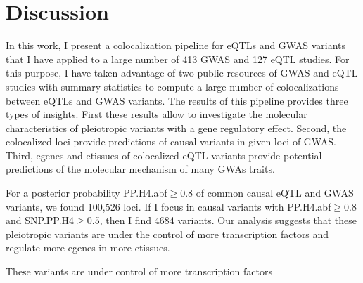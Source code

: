 \section*{Discussion}

In this work, I present a colocalization pipeline for eQTLs and GWAS variants that I have applied to a large number of 413 GWAS and 127 eQTL studies.
%
For this purpose, I have taken advantage of two public resources of GWAS and eQTL studies with summary statistics to compute a large number of colocalizations between eQTLs and GWAS variants.
%
The results of this pipeline provides three types of insights.
%
First these results allow to investigate the molecular characteristics of pleiotropic variants with a gene regulatory effect.
%
Second, the colocalized loci provide predictions of causal variants in given loci of GWAS.
%
Third, egenes and etissues of colocalized eQTL variants provide potential predictions of the molecular mechanism of many GWAs traits.


For a posterior probability PP.H4.abf$\ge$0.8 of common causal eQTL and GWAS variants, we found 100,526 loci.
%
If I focus in causal variants with PP.H4.abf$\ge$0.8 and SNP.PP.H4$\ge$0.5, then I find 4684 variants.
%
Our analysis suggests that these pleiotropic variants are under the control of more transcription factors and regulate more egenes in more etissues.



These variants are under control of more transcription factors

